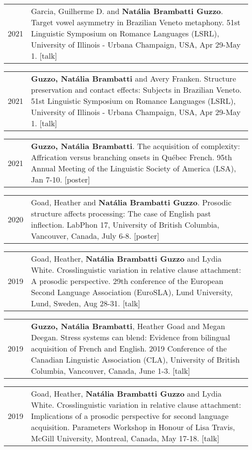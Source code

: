 \documentclass[letterpaper,10pt]{article}
\begin{document}
\begin{tabular}{p{1cm}p{16cm}}
2021 & Garcia, Guilherme D. and \textbf{Nat\'alia Brambatti Guzzo}. Target vowel asymmetry in Brazilian Veneto metaphony. 51st Linguistic Symposium on Romance Languages (LSRL), University of Illinois - Urbana Champaign, USA, Apr 29-May 1. [talk]
\end{tabular}


\begin{tabular}{p{1cm}p{16cm}}
2021 & \textbf{Guzzo, Nat\'alia Brambatti} and Avery Franken. Structure preservation and contact effects: Subjects in Brazilian Veneto. 51st Linguistic Symposium on Romance Languages (LSRL), University of Illinois - Urbana Champaign, USA, Apr 29-May 1. [talk]
\end{tabular}


\begin{tabular}{p{1cm}p{16cm}}
2021 & \textbf{Guzzo, Nat\'alia Brambatti}. The acquisition of complexity: Affrication versus branching onsets in Qu\'ebec French. 95th Annual Meeting of the Linguistic Society of America (LSA), Jan 7-10. [poster]
\end{tabular}

\begin{tabular}{p{1cm}p{16cm}}
2020 & Goad, Heather and \textbf{Nat\'alia Brambatti Guzzo}. Prosodic structure affects processing: The case of English past inflection. LabPhon 17, University of British Columbia, Vancouver, Canada, July 6-8. [poster]
\end{tabular}


\begin{tabular}{p{1cm}p{16cm}}
2019 & Goad, Heather, \textbf{Nat\'alia Brambatti Guzzo} and Lydia White. Crosslinguistic variation in relative clause attachment: A prosodic perspective. 29th conference of the European Second Language Association (EuroSLA), Lund University, Lund, Sweden, Aug 28-31. [talk]
\end{tabular}


\begin{tabular}{p{1cm}p{16cm}}
2019 & \textbf{Guzzo, Nat\'alia Brambatti}, Heather Goad and Megan Deegan. Stress systems can blend: Evidence from bilingual acquisition of French and English. 2019 Conference of the Canadian Linguistic Association (CLA), University of British Columbia, Vancouver, Canada, June 1-3. [talk]
\end{tabular}


\begin{tabular}{p{1cm}p{16cm}}
2019 & Goad, Heather, \textbf{Nat\'alia Brambatti Guzzo} and Lydia White. Crosslinguistic variation in relative clause attachment: Implications of a prosodic perspective for second language acquisition. Parameters Workshop in Honour of Lisa Travis, McGill University, Montreal, Canada, May 17-18. [talk]
\end{tabular}
\end{document}
